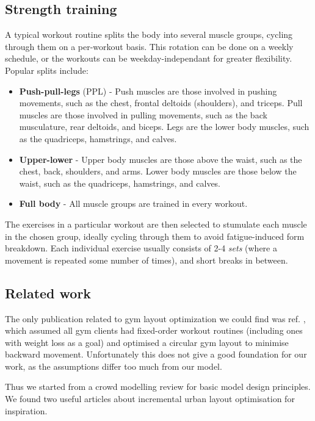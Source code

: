 \documentclass[9pt]{pnas-new}
\begin{document}
\subsection*{Strength training}
A typical workout routine splits the body into several muscle groups, cycling through them on a per-workout basis. This rotation can be done on a weekly schedule, or the workouts can be weekday-independant for greater flexibility. Popular splits include:
\begin{itemize}
	\item \textbf{Push-pull-legs} (PPL) - Push muscles are those involved in pushing movements,
	such as the chest, frontal deltoids (shoulders), and triceps. Pull muscles are those involved in pulling movements, such as the back musculature, rear deltoids, and biceps. Legs are the lower body muscles, such as the quadriceps, hamstrings, and calves.
	\item \textbf{Upper-lower} - Upper body muscles are those above the waist, such as the chest, back, shoulders, and arms. Lower body muscles are those below the waist, such as the quadriceps, hamstrings, and calves.
	\item \textbf{Full body} - All muscle groups are trained in every workout.
\end{itemize}
The exercises in a particular workout are then selected to stumulate each muscle in the chosen group, ideally cycling through them to avoid fatigue-induced form breakdown. Each individual exercise usually consists of 2-4 {\it sets} (where a movement is repeated some number of times), and short breaks in between.


\subsection*{Related work}
The only publication related to gym layout optimization we could find was ref. \cite{turcine2022gym}, which assumed all gym clients had fixed-order workout routines (including ones with weight loss as a goal) and optimised a circular gym layout to minimise backward movement. Unfortunately this does not give a good foundation for our work, as the assumptions differ too much from our model.

Thus we started from a crowd modelling review \cite{yang2020crowd_modelling_review} for basic model design principles. We found two useful articles about incremental urban layout optimisation \cite{feng2016crowd_drive_layout_design, mathew2019urban_walkability} for inspiration.
\end{document}
